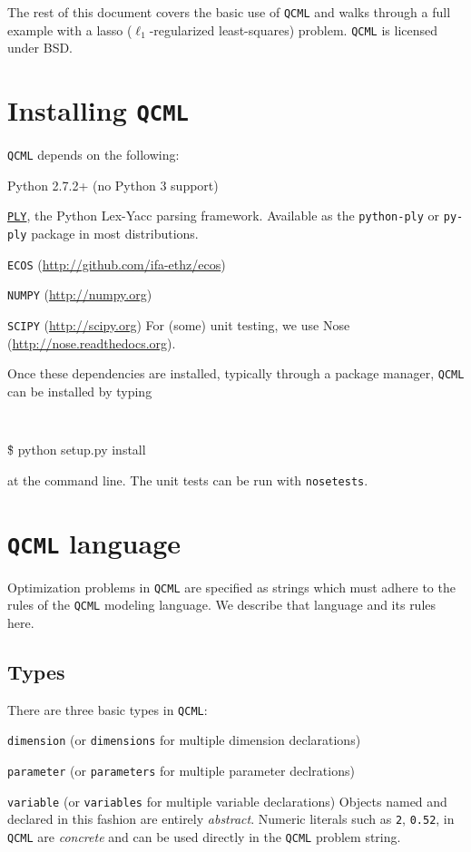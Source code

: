 \documentclass[11pt]{article}
\def\qcml{\texttt{QCML}\xspace}
\begin{document}
The rest of this document covers the basic use of \qcml and walks through a
full example with a lasso ($\ell_1$-regularized least-squares) problem. 
\qcml is licensed under BSD.

\newpage
\tableofcontents
\newpage

\section{Installing \qcml}
\qcml depends on the following:
\BIT 
\item Python 2.7.2+ (no Python 3 support)
\item \href{http://www.dabeaz.com/ply/}{\tt PLY}, the Python Lex-Yacc parsing framework.
  Available as the {\tt python-ply} or {\tt py-ply} package in most distributions.
\item {\tt ECOS} (\url{http://github.com/ifa-ethz/ecos})
\item {\tt NUMPY} (\url{http://numpy.org})
\item {\tt SCIPY} (\url{http://scipy.org})
\EIT
For (some) unit testing, we use Nose (\url{http://nose.readthedocs.org}).

Once these dependencies are installed, typically through a package manager,
\qcml can be installed by typing
{\tt
\begin{tabbing}
  \qquad \= \$ python setup.py install
\end{tabbing}
}
\noindent at the command line. The unit tests can be run with {\tt nosetests}.

\section{\qcml language}
Optimization problems in \qcml are specified as strings which must adhere to 
the rules of the \qcml modeling language. We describe that language and its
rules here.

\subsection{Types}
There are three basic types in \qcml:
\BIT
\item {\tt dimension} (or {\tt dimensions} for multiple dimension declarations)
\item {\tt parameter} (or {\tt parameters} for multiple parameter declrations)
\item {\tt variable} (or {\tt variables} for multiple variable declarations)
\EIT
Objects named and declared in this fashion are entirely \emph{abstract}.
Numeric literals such as {\tt 2}, {\tt 0.52}, \etc in \qcml are
\emph{concrete} and can be used directly in the \qcml problem string. 
\end{document}

